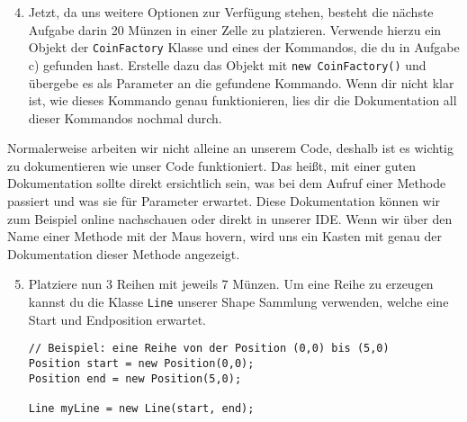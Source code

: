 \begin{enumerate} \setcounter{enumi}{3}
    \item Jetzt, da uns weitere Optionen zur Verfügung stehen, besteht die nächste Aufgabe darin 20 Münzen in einer Zelle zu platzieren. Verwende hierzu ein Objekt der \texttt{CoinFactory} Klasse und eines der Kommandos, die du in Aufgabe c) gefunden hast. Erstelle dazu das Objekt mit \texttt{new CoinFactory()} und übergebe es als Parameter an die gefundene Kommando. Wenn dir nicht klar ist, wie dieses Kommando genau funktionieren, lies dir die Dokumentation all dieser Kommandos nochmal durch.

\end{enumerate}

\begin{Infobox}
    Normalerweise arbeiten wir nicht alleine an unserem Code, deshalb ist es wichtig zu dokumentieren wie unser Code funktioniert. Das heißt, mit einer guten Dokumentation sollte direkt ersichtlich sein, was bei dem Aufruf einer Methode passiert und was sie für Parameter erwartet. Diese Dokumentation können wir zum Beispiel online nachschauen oder direkt in unserer IDE. Wenn wir über den Name einer Methode mit der Maus hovern, wird uns ein Kasten mit genau der Dokumentation dieser Methode angezeigt.
\end{Infobox}


\begin{enumerate} \setcounter{enumi}{4}
    \item Platziere nun 3 Reihen mit jeweils 7 Münzen. Um eine Reihe zu erzeugen kannst du die Klasse \texttt{Line} unserer Shape Sammlung verwenden, welche eine Start und Endposition erwartet.

    \begin{lstlisting}
// Beispiel: eine Reihe von der Position (0,0) bis (5,0)
Position start = new Position(0,0);
Position end = new Position(5,0);

Line myLine = new Line(start, end);
    \end{lstlisting}

\end{enumerate}
